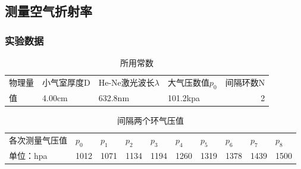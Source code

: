 \documentclass{ctexart}
\begin{document}
      \subsection{测量空气折射率}
      \subsubsection{实验数据}
\begin{table}[htbp]
  \centering
  \caption{所用常数}
  \resizebox{\textwidth}{!}
  {
    \begin{tabular}{llllr}
    物理量   & 小气室厚度D & He-Ne激光波长$\lambda$ & 大气压数值$p_0$ & \multicolumn{1}{l}{间隔环数N} \\
    值     & 4.00cm & 632.8nm & 101.2kpa & 2 \\
    \end{tabular}%
  }
  \label{tab:addlabel}%
\end{table}%
\begin{table}[htbp]
  \centering
  \caption{间隔两个环气压值}
  \resizebox{\textwidth}{!}
  {
    \begin{tabular}{lrrrrrrrrr}
    各次测量气压值 & \multicolumn{1}{l}{$p_0$} & \multicolumn{1}{l}{$p_1$} & \multicolumn{1}{l}{$p_2$} & \multicolumn{1}{l}{$p_3$} & \multicolumn{1}{l}{$p_4$} & \multicolumn{1}{l}{$p_5$} & \multicolumn{1}{l}{$p_6$} & \multicolumn{1}{l}{$p_7$} & \multicolumn{1}{l}{$p_8$} \\
    单位：hpa & 1012  & 1071  & 1134  & 1194  & 1260  & 1319  & 1378  & 1439  & 1500 \\
    \end{tabular}%
  }
  \label{tab:addlabel}%
\end{table}%
\end{document}
